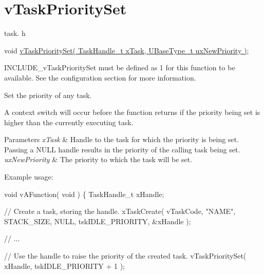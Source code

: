 \hypertarget{group__v_task_priority_set}{}\section{v\+Task\+Priority\+Set}
\label{group__v_task_priority_set}
task. h 
\begin{DoxyPre}
void \hyperlink{externals_2freertos_2include_2task_8h_a1ee31be76e326e0644dbd6ac40a787b6}{vTaskPrioritySet( TaskHandle\_t xTask, UBaseType\_t uxNewPriority )};
\end{DoxyPre}


I\+N\+C\+L\+U\+D\+E\+\_\+v\+Task\+Priority\+Set must be defined as 1 for this function to be available. See the configuration section for more information.

Set the priority of any task.

A context switch will occur before the function returns if the priority being set is higher than the currently executing task.


\begin{DoxyParams}{Parameters}
{\em x\+Task} & Handle to the task for which the priority is being set. Passing a N\+U\+LL handle results in the priority of the calling task being set.\\
\hline
{\em ux\+New\+Priority} & The priority to which the task will be set.\\
\hline
\end{DoxyParams}
Example usage\+: 
\begin{DoxyPre}
void vAFunction( void )
\{
TaskHandle\_t xHandle;\end{DoxyPre}



\begin{DoxyPre}  // Create a task, storing the handle.
  xTaskCreate( vTaskCode, "NAME", STACK\_SIZE, NULL, tskIDLE\_PRIORITY, \&xHandle );\end{DoxyPre}



\begin{DoxyPre}  // ...\end{DoxyPre}



\begin{DoxyPre}  // Use the handle to raise the priority of the created task.
  vTaskPrioritySet( xHandle, tskIDLE\_PRIORITY + 1 );\end{DoxyPre}



